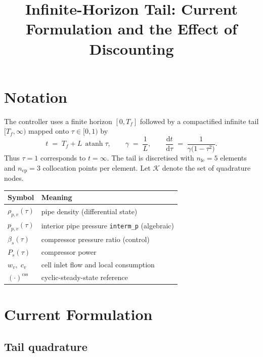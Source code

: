 \documentclass[11pt]{article}
\title{Infinite-Horizon Tail: Current Formulation and the Effect of Discounting}
\date{}
\newcommand{\css}{\mathrm{css}}
\begin{document}
\maketitle

\section{Notation}

The controller uses a finite horizon $[0,T_f]$ followed by a compactified
infinite tail $[T_f,\infty)$ mapped onto $\tau\in[0,1)$ by
%
\begin{equation}
  t \;=\; T_f + L\,\operatorname{atanh}\tau,
  \qquad
  \gamma \;=\; \frac{1}{L},
  \qquad
  \frac{\mathrm{d}t}{\mathrm{d}\tau} \;=\; \frac{1}{\gamma\bigl(1-\tau^{2}\bigr)} .
  \label{eq:transform}
\end{equation}
%
Thus $\tau=1$ corresponds to $t=\infty$. The tail is discretised with
$n_{\mathrm{fe}}=5$ elements and $n_{\mathrm{cp}}=3$ collocation points per
element. Let $\mathcal{K}$ denote the set of quadrature nodes.

\begin{center}
\begin{tabular}{ll}
\toprule
Symbol & Meaning \\
\midrule
$\rho_{p,v}(\tau)$ & pipe density (differential state) \\
$p_{p,v}(\tau)$    & interior pipe pressure \texttt{interm\_p} (algebraic) \\
$\beta_s(\tau)$    & compressor pressure ratio (control) \\
$P_s(\tau)$        & compressor power \\
$w_v,\;c_v$        & cell inlet flow and local consumption \\
$(\cdot)^{\css}$   & cyclic-steady-state reference \\
\bottomrule
\end{tabular}
\end{center}

\section{Current Formulation}

\subsection{Tail quadrature}
\end{document}
